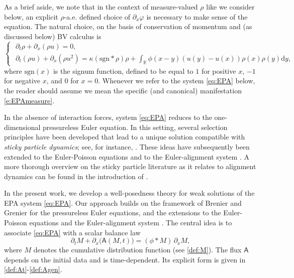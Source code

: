 \documentclass[10pt,a4paper]{amsart}
\def\R{\mathbb{R}}
\def\dd{\mathrm{d}}
\def\pa{\partial}
\def\A{\mathsf{A}}
\newcommand{\sgn}[1]{\mathrm{sgn}(#1)}
\begin{document}
	As a brief aside, we note that in the context of measure-valued $\rho$ like we consider below, an explicit $\rho$-a.e. defined choice of $\partial_x \varphi$ is necessary to make sense of the equation.  The natural choice, on the basis of conservation of momentum and (as discussed below) BV calculus is 
	\begin{equation} 
		\label{e:EPAmeasure}
		\begin{cases}
			\,\,\pa_t \rho +\pa_x(\rho u)=0,\\
			\,\,\pa_t (\rho u) +\pa_x (\rho u^2) = \kappa (\mathrm{sgn}*\rho)\rho + \displaystyle \int_\R \phi(x-y)(u(y)-u(x))\rho(x)\rho(y)\dd y,
		\end{cases}
	\end{equation} 
	where $\sgn{x}$ is the signum function, defined to be equal to $1$ for positive $x$, $-1$ for negative $x$, and $0$ for $x = 0$.  Whenever we refer to the system \eqref{eq:EPA} below, the reader should assume we mean the specific (and canonical) manifestation \eqref{e:EPAmeasure}.
	
	In the absence of interaction forces, system \eqref{eq:EPA} reduces to the one-dimensional pressureless Euler equation. In this setting, several selection principles have been developed that lead to a unique solution compatible with \emph{sticky particle dynamics}; see, for instance, \cite{e1996generalized,brenier1998sticky,bouchut1998one}. These ideas have subsequently been extended to the Euler-Poisson equations \cite{nguyen2008pressureless,brenier2013sticky,carrillo2023equivalence,Tudorascuetal2025} and to the Euler-alignment system \cite{leslie2023sticky,leslie2024finite,galtung2025sticky}.  A more thorough overview on the sticky particle literature as it relates to alignment dynamics can be found in the introduction of \cite{leslie2023sticky}.
	
	In the present work, we develop a well-posedness theory for weak solutions of the EPA system \eqref{eq:EPA}. Our approach builds on the framework of Brenier and Grenier \cite{brenier1998sticky} for the pressureless Euler equations, and the extensions to the Euler-Poisson equations \cite{nguyen2008pressureless, NguyenTudorascu2015} and the Euler-alignment system \cite{leslie2023sticky}. The central idea is to associate \eqref{eq:EPA} with a scalar balance law
	\begin{equation}
		\label{eq:balancelaw}
		\pa_t M + \pa_x\big(\A(M,t)\big) = (\phi\ast M)\,\pa_x M,
	\end{equation}
	where $M$ denotes the cumulative distribution function (see \eqref{def:M}). The flux $\A$ depends on the initial data and is time-dependent. Its explicit form is given in \eqref{def:At}-\eqref{def:Agen}.
	
\end{document}
